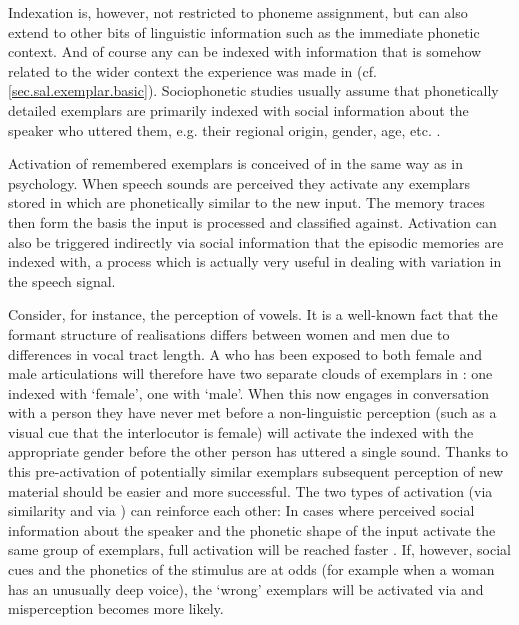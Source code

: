 Indexation is, however, not restricted to phoneme assignment, but can also extend to other bits of linguistic information such as the immediate phonetic context.
And of course any  can be indexed with information that is somehow related to the wider context the experience was made in (cf. \ref{sec.sal.exemplar.basic}).
Sociophonetic studies usually assume that phonetically detailed exemplars are primarily indexed with social information about the speaker who uttered them, e.g. their regional origin, gender, age, etc. \parencite[cf.][370]{hayetal2006a}.

Activation of remembered exemplars is conceived of in the same way as in psychology.
When speech sounds are perceived they activate any exemplars stored in  which are phonetically similar to the new input.
The  memory traces then form the basis the input is processed and classified against.
Activation can also be triggered indirectly via social information that the episodic memories are indexed with, a process which is actually very useful in dealing with variation in the speech signal.

Consider, for instance, the perception of vowels.
It is a well-known fact that the formant structure of  realisations differs between women and men due to differences in vocal tract length.
A  who has been exposed to both female and male  articulations will therefore have two separate clouds of exemplars in : one indexed with `female', one with `male'.
When this  now engages in conversation with a person they have never met before a non-linguistic perception (such as a visual cue that the interlocutor is female) will activate the  indexed with the appropriate gender before the other person has uttered a single sound.
Thanks to this pre-activation of potentially similar exemplars subsequent perception of new material should be easier and more successful.
The two types of activation (via similarity and via ) can reinforce each other: In cases where perceived social information about the speaker and the phonetic shape of the input activate the same group of exemplars, full activation will be reached faster \parencite[cf.][370--371]{hayetal2006a}.
If, however, social cues and the phonetics of the stimulus are at odds (for example when a woman has an unusually deep voice), the `wrong' exemplars will be activated via  and misperception becomes more likely.

